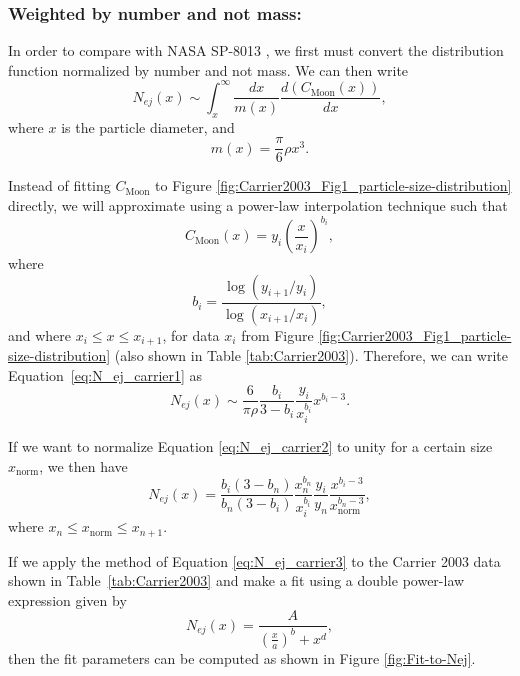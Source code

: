 \documentclass{hitec}
\numberwithin{equation}{section}
\begin{document}
\subsubsection{Weighted by number and not mass:}
In order to compare with NASA SP-8013 \citep{cour1969meteoroid}, we first must convert the distribution function normalized by number and not mass. We can then write
\begin{equation}\label{eq:N_ej_carrier1}
N_{ej}(x) \sim \int_{x}^{\infty}\frac{dx}{m(x)}\frac{d(C_{\text{Moon}}(x))}{dx},
\end{equation}
where $x$ is the particle diameter, and
\begin{equation}
m(x) = \frac{\pi}{6}\rho x^3.
\end{equation}

Instead of fitting $C_{\text{Moon}}$ to Figure \ref{fig:Carrier2003_Fig1_particle-size-distribution} directly, we will approximate using a power-law interpolation technique such that
\begin{equation}
C_{\text{Moon}}(x) = y_i\left(\frac{x}{x_i}\right)^{b_i},
\end{equation}
where
\begin{equation}
b_i = \frac{\log(y_{i+1}/y_i)}{\log(x_{i+1}/x_i)},
\end{equation}
and where $x_i \le x \le x_{i+1}$, for data $x_i$ from Figure \ref{fig:Carrier2003_Fig1_particle-size-distribution} (also shown in Table \ref{tab:Carrier2003}). Therefore, we can write Equation~\eqref{eq:N_ej_carrier1} as
\begin{equation}\label{eq:N_ej_carrier2}
N_{ej}(x) \sim \frac{6}{\pi\rho}\frac{b_i}{3-b_i}\frac{y_i}{x_i^{b_i}}x^{b_i-3}.
\end{equation}

If we want to normalize Equation \eqref{eq:N_ej_carrier2} to unity for a certain size $x_{\text{norm}}$, we then have
\begin{equation}\label{eq:N_ej_carrier3}
N_{ej}(x) = \frac{b_i(3-b_n)}{b_n(3-b_i)}\frac{x_n^{b_n}}{x_i^{b_i}}\frac{y_i}{y_n}\frac{x^{b_i-3}}{x_{\text{norm}}^{b_n-3}},
\end{equation}
where $x_n \le x_{\text{norm}} \le x_{n+1}$.

If we apply the method of Equation \eqref{eq:N_ej_carrier3} to the Carrier 2003 data shown in Table~\ref{tab:Carrier2003} and make a fit using a double power-law expression given by
\begin{equation}\label{eq:double_power-law}
N_{ej}(x) = \frac{A}{\left(\frac{x}{a}\right)^b + x^d},
\end{equation}
then the fit parameters can be computed as shown in Figure \ref{fig:Fit-to-Nej}.
\end{document}
